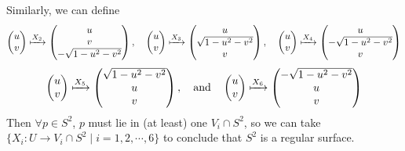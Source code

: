 \begin{itemize}
\noindent Similarly, we can define
\[
\begin{pmatrix}u\\ v\end{pmatrix}\xmapsto{X_2}\begin{pmatrix}u\\ v\\ -\sqrt{1-u^2-v^2}\end{pmatrix},\quad
\begin{pmatrix}u\\ v\end{pmatrix}\xmapsto{X_3}\begin{pmatrix}u\\ \sqrt{1-u^2-v^2}\\ v\end{pmatrix},\quad
\begin{pmatrix}u\\ v\end{pmatrix}\xmapsto{X_4}\begin{pmatrix}u\\ -\sqrt{1-u^2-v^2}\\ v\end{pmatrix}
\]
\[
\begin{pmatrix}u\\ v\end{pmatrix}\xmapsto{X_5}\begin{pmatrix}\sqrt{1-u^2-v^2}\\ u\\ v\end{pmatrix},\quad\text{and}\quad
\begin{pmatrix}u\\ v\end{pmatrix}\xmapsto{X_6}\begin{pmatrix}-\sqrt{1-u^2-v^2}\\ u\\ v\end{pmatrix}
\]
Then $\forall p\in S^2$, $p$ must lie in (at least) one $V_i\cap S^2$, so we can take $\{X_i: U\to V_i\cap S^2 \mid i = 1, 2, \cdots, 6\}$ to conclude that $S^2$ is a regular surface.
\end{itemize}

